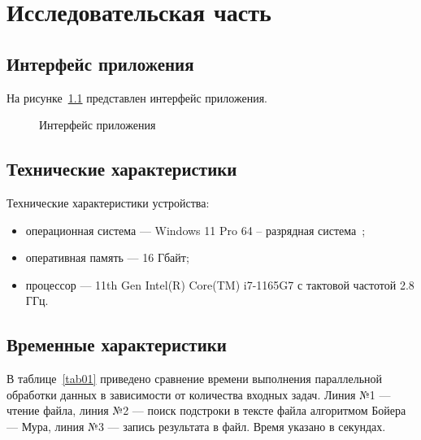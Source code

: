 \chapter{Исследовательская часть}

\section{Интерфейс приложения}

На рисунке~\ref{fig:interface} представлен интерфейс приложения.

\begin{figure}[h!]
	\caption{Интерфейс приложения}
	\label{fig:interface}
\end{figure}

\section{Технические характеристики}

Технические характеристики устройства:

\begin{itemize}
	\item операционная система --- Windows 11 Pro 64 -- разрядная система~\cite{windows};
	\item оперативная память --- 16 Гбайт;
	\item процессор --- 11th Gen Intel(R) Core(TM) i7-1165G7 с тактовой частотой 2.8 ГГц.
\end{itemize}

\section{Временные характеристики}

В таблице~\ref{tab01} приведено сравнение времени выполнения параллельной обработки данных в зависимости от количества входных задач.
Линия №1 --- чтение файла, линия №2 --- поиск подстроки в тексте файла алгоритмом Бойера --- Мура, линия №3 --- запись результата в файл.
Время указано в секундах.

